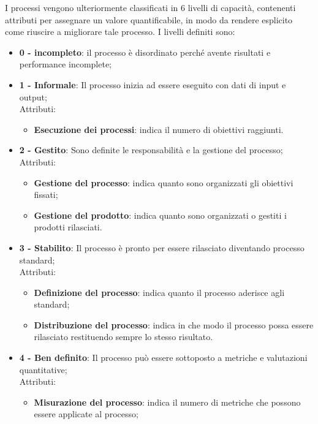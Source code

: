 \documentclass[../norme-di-progetto.tex]{subfiles}
\begin{document}
I processi vengono ulteriormente classificati in 6 livelli di capacità, contenenti attributi per assegnare un valore quantificabile, in modo da rendere esplicito come riuscire a migliorare tale processo.
I livelli definiti sono:
\begin{itemize}
    \item \textbf{0 - incompleto}: il processo è disordinato perché avente risultati e performance incomplete;
    \item \textbf{1 - Informale}: Il processo inizia ad essere eseguito con dati di input e output;
       \\ Attributi:
        \begin{itemize}
            \item \textbf{Esecuzione dei processi}: indica il numero di obiettivi raggiunti.
        \end{itemize}
    \item \textbf{2 - Gestito}: Sono definite le responsabilità e la gestione del processo;
        \\ Attributi:
        \begin{itemize}
            \item \textbf{Gestione del processo}: indica quanto sono organizzati gli obiettivi fissati;
            \item \textbf{Gestione del prodotto}: indica quanto sono organizzati o gestiti i prodotti rilasciati.
        \end{itemize}
    \item \textbf{3 - Stabilito}: Il processo è pronto per essere rilasciato diventando processo standard;
        \\ Attributi:
        \begin{itemize}
            \item \textbf{Definizione del processo}: indica quanto il processo aderisce agli standard;
            \item \textbf{Distribuzione del processo}: indica in che modo il processo possa essere rilasciato restituendo sempre lo stesso risultato.
        \end{itemize}
    \item \textbf{4 - Ben definito}: Il processo può essere sottoposto a metriche e valutazioni quantitative;
        \\ Attributi:
        \begin{itemize}
            \item \textbf{Misurazione del processo}: indica il numero di metriche che possono essere applicate al processo;

\end{itemize}
\end{itemize}
\end{document}
